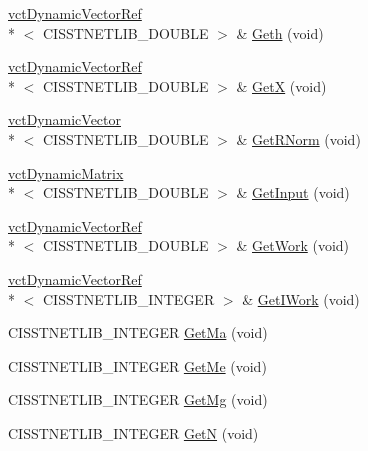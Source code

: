 \begin{DoxyCompactItemize}
\item 
\hyperlink{classvct_dynamic_vector_ref}{vct\-Dynamic\-Vector\-Ref}\\*
$<$ C\-I\-S\-S\-T\-N\-E\-T\-L\-I\-B\-\_\-\-D\-O\-U\-B\-L\-E $>$ \& \hyperlink{classnmr_l_sq_lin_solution_dynamic_1_1_friend_a0e66f7bc106e85d3f1de91bedf65cf71}{Geth} (void)
\item 
\hyperlink{classvct_dynamic_vector_ref}{vct\-Dynamic\-Vector\-Ref}\\*
$<$ C\-I\-S\-S\-T\-N\-E\-T\-L\-I\-B\-\_\-\-D\-O\-U\-B\-L\-E $>$ \& \hyperlink{classnmr_l_sq_lin_solution_dynamic_1_1_friend_ac525854fc39b0d8147d68bdee71bed4e}{Get\-X} (void)
\item 
\hyperlink{classvct_dynamic_vector}{vct\-Dynamic\-Vector}\\*
$<$ C\-I\-S\-S\-T\-N\-E\-T\-L\-I\-B\-\_\-\-D\-O\-U\-B\-L\-E $>$ \& \hyperlink{classnmr_l_sq_lin_solution_dynamic_1_1_friend_a4d2bbf0dcbde09a93eb2d4e9a8872515}{Get\-R\-Norm} (void)
\item 
\hyperlink{classvct_dynamic_matrix}{vct\-Dynamic\-Matrix}\\*
$<$ C\-I\-S\-S\-T\-N\-E\-T\-L\-I\-B\-\_\-\-D\-O\-U\-B\-L\-E $>$ \& \hyperlink{classnmr_l_sq_lin_solution_dynamic_1_1_friend_a44485cbd2a634edbbfca73a68be4136d}{Get\-Input} (void)
\item 
\hyperlink{classvct_dynamic_vector_ref}{vct\-Dynamic\-Vector\-Ref}\\*
$<$ C\-I\-S\-S\-T\-N\-E\-T\-L\-I\-B\-\_\-\-D\-O\-U\-B\-L\-E $>$ \& \hyperlink{classnmr_l_sq_lin_solution_dynamic_1_1_friend_a247cd584f9fec9e74a3b693c01dc817b}{Get\-Work} (void)
\item 
\hyperlink{classvct_dynamic_vector_ref}{vct\-Dynamic\-Vector\-Ref}\\*
$<$ C\-I\-S\-S\-T\-N\-E\-T\-L\-I\-B\-\_\-\-I\-N\-T\-E\-G\-E\-R $>$ \& \hyperlink{classnmr_l_sq_lin_solution_dynamic_1_1_friend_ab457f473be3ba45f7dbbc41d7ed15c0b}{Get\-I\-Work} (void)
\item 
C\-I\-S\-S\-T\-N\-E\-T\-L\-I\-B\-\_\-\-I\-N\-T\-E\-G\-E\-R \hyperlink{classnmr_l_sq_lin_solution_dynamic_1_1_friend_ab38bee75a5527e2a72bdfdc6de8ba650}{Get\-Ma} (void)
\item 
C\-I\-S\-S\-T\-N\-E\-T\-L\-I\-B\-\_\-\-I\-N\-T\-E\-G\-E\-R \hyperlink{classnmr_l_sq_lin_solution_dynamic_1_1_friend_aaaf2bc7cea38419748585aa23a298a70}{Get\-Me} (void)
\item 
C\-I\-S\-S\-T\-N\-E\-T\-L\-I\-B\-\_\-\-I\-N\-T\-E\-G\-E\-R \hyperlink{classnmr_l_sq_lin_solution_dynamic_1_1_friend_afed79b5fe2a8ddbdc8c7f77756892eac}{Get\-Mg} (void)
\item 
C\-I\-S\-S\-T\-N\-E\-T\-L\-I\-B\-\_\-\-I\-N\-T\-E\-G\-E\-R \hyperlink{classnmr_l_sq_lin_solution_dynamic_1_1_friend_a8e27d5175fee9e58874f7f86393822cb}{Get\-N} (void)
\end{DoxyCompactItemize}


